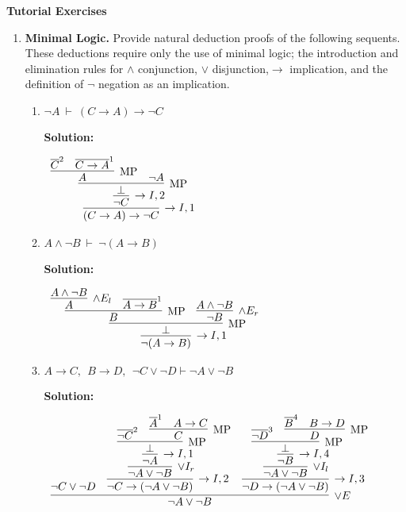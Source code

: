\documentclass[11pt]{report}
\newcommand{\temp}[2]{{\overline{#2}}^{#1}}
\begin{document}
\newpage
{\bf Tutorial Exercises}
\begin{enumerate}

	\item \textbf{Minimal Logic.} Provide natural deduction proofs of the following sequents. These deductions require only the use of minimal logic; the introduction and elimination rules for $\land$ conjunction, $\lor$ disjunction,$\to$ implication, and the definition of $\lnot$ negation as an implication. 
	 
	\begin{enumerate}
		\item $\lnot A \ \vdash \ (C \to A) \to \lnot C$
		
		\textbf{Solution:}

		\begin{center}
			$\begin{array}{c}
				\infer[\to I, 1]{(C \to A) \to \lnot C}
					{\infer[\to I, 2]{\lnot C}
						{\infer[\MP]{\bot}
							{\infer[\MP]{A}{\temp{2}{C} & \temp{1}{C \to A}}
							&
							\lnot A}}}
			\end{array}$
		\end{center}

		\item $A \land \lnot B \ \vdash \ \lnot (A \to B)$
		
		\textbf{Solution:}

		\begin{center}
			$\begin{array}{c}
				\infer[\to I, 1]{\lnot (A \to B)}
					{\infer[\MP]{\bot}
						{\infer[\MP]{B}
							{\infer[\land E_{l}]{A}{A \land \lnot B}
							&
							\temp{1}{A \to B}}
						&
						\infer[\land E_{r}]{\lnot B}{A \land \lnot B}}}
			\end{array}$
		\end{center}

		\item $ A\to  C,\ \  B \to  D,\ \ \neg C \lor \neg  D \vdash  \neg A\lor \neg  B$
		
		\textbf{Solution:}

		\begin{center}
			$\begin{array}{c}
				\infer[\lor E]{\lnot A \lor \lnot B}
					{\lnot C \lor \lnot D
					&
					\infer[\to I, 2]{\lnot C \to (\lnot A \lor \lnot B)}
						{\infer[\lor I_{r}]{\lnot A \lor \lnot B}
							{\infer[\to I,1]{\lnot A}
								{\infer[\MP]{\bot}
									{\temp{2}{\lnot C}
									&
									\infer[\MP]{C}
										{\temp{1}{A}
										&
										A \to C}}}}}
					&
					\infer[\to I, 3]{\lnot D \to (\lnot A \lor \lnot B)}
						{\infer[\lor I_{l}]{\lnot A \lor \lnot B}
							{\infer[\to I,4]{\lnot B}
								{\infer[\MP]{\bot}
									{\temp{3}{\lnot D}
									&
									\infer[\MP]{D}
										{\temp{4}{B}
										&
										B \to D}}}}}}
			\end{array}$
		\end{center}


\end{enumerate}
\end{enumerate}
\end{document}
